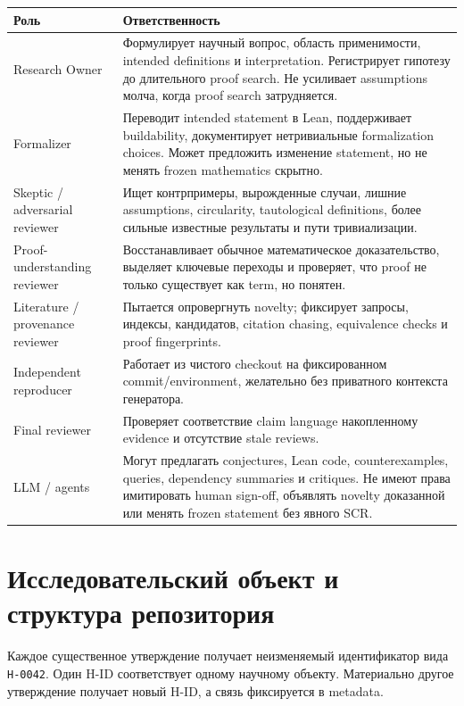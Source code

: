 \documentclass[11pt,a4paper]{article}
\newcommand{\status}[1]{\texttt{#1}}
\begin{document}
\begin{longtable}{@{}p{}p{}@{}}
\toprule
\textbf{Роль} & \textbf{Ответственность} \\
\midrule
\endhead
Research Owner & Формулирует научный вопрос, область применимости, intended definitions и interpretation. Регистрирует гипотезу до длительного proof search. Не усиливает assumptions молча, когда proof search затрудняется. \\
Formalizer & Переводит intended statement в Lean, поддерживает buildability, документирует нетривиальные formalization choices. Может предложить изменение statement, но не менять frozen mathematics скрытно. \\
Skeptic / adversarial reviewer & Ищет контрпримеры, вырожденные случаи, лишние assumptions, circularity, tautological definitions, более сильные известные результаты и пути тривиализации. \\
Proof-understanding reviewer & Восстанавливает обычное математическое доказательство, выделяет ключевые переходы и проверяет, что proof не только существует как term, но понятен. \\
Literature / provenance reviewer & Пытается опровергнуть novelty; фиксирует запросы, индексы, кандидатов, citation chasing, equivalence checks и proof fingerprints. \\
Independent reproducer & Работает из чистого checkout на фиксированном commit/environment, желательно без приватного контекста генератора. \\
Final reviewer & Проверяет соответствие claim language накопленному evidence и отсутствие stale reviews. \\
LLM / agents & Могут предлагать conjectures, Lean code, counterexamples, queries, dependency summaries и critiques. Не имеют права имитировать human sign-off, объявлять novelty доказанной или менять frozen statement без явного SCR. \\
\bottomrule
\end{longtable}

\section{Исследовательский объект и структура репозитория}

Каждое существенное утверждение получает неизменяемый идентификатор вида \status{H-0042}. Один H-ID соответствует одному научному объекту. Материально другое утверждение получает новый H-ID, а связь фиксируется в metadata.
\end{document}
